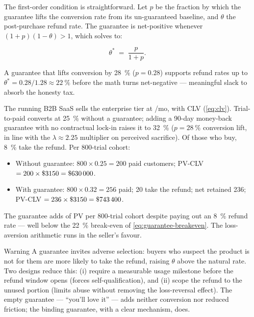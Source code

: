 The first-order condition is straightforward. Let $p$ be the fraction by which the guarantee lifts the conversion rate from its un-guaranteed baseline, and $\theta$ the post-purchase refund rate. The guarantee is net-positive whenever $(1+p)(1-\theta) > 1$, which solves to:

\begin{equation}\label{eq:guarantee-breakeven}
  \theta^{*} \;=\; \frac{p}{1+p}.
\end{equation}

A guarantee that lifts conversion by \qty{28}{\percent} ($p = 0.28$) supports refund rates up to $\theta^{*} = 0.28/1.28 \approx \qty{22}{\percent}$ before the math turns net-negative --- meaningful slack to absorb the honesty tax.

\begin{example}
The running B2B SaaS sells the enterprise tier at /mo, with CLV  (\cref{eq:clv}). Trial-to-paid converts at \qty{25}{\percent} without a guarantee; adding a \num{90}-day money-back guarantee with no contractual lock-in raises it to \qty{32}{\percent} ($p = \qty{28}{\percent}$ conversion lift, in line with the $\lambda \approx 2.25$ multiplier on perceived sacrifice). Of those who buy, \qty{8}{\percent} take the refund. Per 800-trial cohort:

\begin{itemize}
  \item Without guarantee: $800 \times 0.25 = 200$ paid customers; PV-CLV $= 200 \times \$\num{3150} = \$\num{630000}$.
  \item With guarantee: $800 \times 0.32 = 256$ paid; \num{20} take the refund; net retained \num{236}; PV-CLV $= 236 \times \$\num{3150} = \$\num{743400}$.
\end{itemize}

The guarantee adds  of PV per 800-trial cohort despite paying out an \qty{8}{\percent} refund rate --- well below the \qty{22}{\percent} break-even of \cref{eq:guarantee-breakeven}. The loss-aversion arithmetic runs in the seller's favour.
\end{example}

\begin{admonition}{Warning}
A guarantee invites adverse selection: buyers who suspect the product is not for them are more likely to take the refund, raising $\theta$ above the natural rate. Two designs reduce this: (i) require a measurable usage milestone before the refund window opens (forces self-qualification), and (ii) scope the refund to the unused portion (limits abuse without removing the loss-reversal effect). The empty guarantee --- ``you'll love it'' --- adds neither conversion nor reduced friction; the binding guarantee, with a clear mechanism, does.
\end{admonition}

